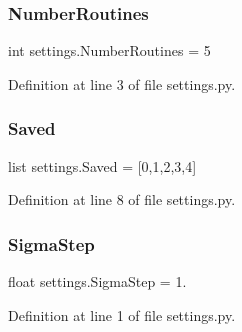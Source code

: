 \subsubsection{Number\+Routines}
{\footnotesize\ttfamily int settings.\+Number\+Routines = 5}



Definition at line 3 of file settings.\+py.

\mbox{\label{namespacesettings_ab681a3c8e130e73294ef80048994de31}} 
\subsubsection{Saved}
{\footnotesize\ttfamily list settings.\+Saved = [0,1,2,3,4]}



Definition at line 8 of file settings.\+py.

\mbox{\label{namespacesettings_a341d5cd3159c76e752b6308bcedd89a9}} 
\subsubsection{Sigma\+Step}
{\footnotesize\ttfamily float settings.\+Sigma\+Step = 1.}



Definition at line 1 of file settings.\+py.


